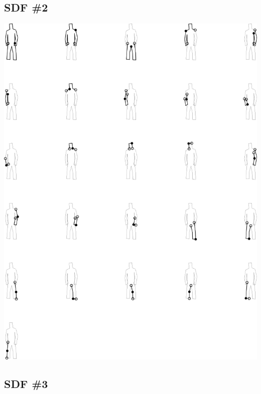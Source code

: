 \subsection{SDF \#2}

\includegraphics[width=6in]{output/3.learning/learning_setup/learning_setup_sdf1_.png}
\subsection{SDF \#3}

